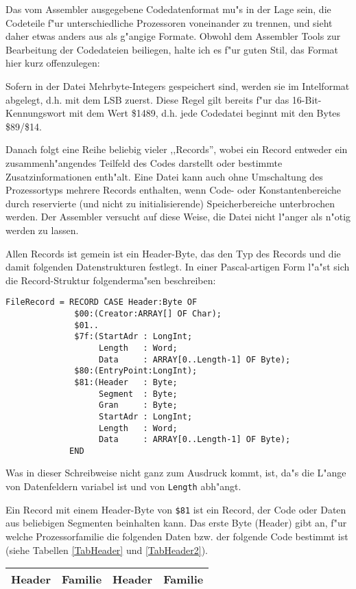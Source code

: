 \documentclass[12pt,a4paper,twoside]{report}
\begin{document}
Das vom Assembler ausgegebene Codedatenformat mu"s in der Lage sein,
die Codeteile f"ur unterschiedliche Prozessoren voneinander zu trennen,
und sieht daher etwas anders aus als g"angige Formate.  Obwohl dem
Assembler Tools zur Bearbeitung der Codedateien beiliegen, halte ich es
f"ur guten Stil, das Format hier kurz offenzulegen:
\par
Sofern in der Datei Mehrbyte-Integers gespeichert sind, werden sie
im Intelformat abgelegt, d.h. mit dem LSB zuerst.  Diese Regel gilt
bereits f"ur das 16-Bit-Kennungswort mit dem Wert \$1489, d.h. jede
Codedatei beginnt mit den Bytes \$89/\$14.
\par
Danach folgt eine Reihe beliebig vieler ,,Records'', wobei ein Record
entweder ein zusammenh"angendes Teilfeld des Codes darstellt oder bestimmte
Zusatzinformationen enth"alt.  Eine Datei
kann auch ohne Umschaltung des Prozessortyps mehrere Records enthalten,
wenn Code- oder Konstantenbereiche durch reservierte (und nicht zu
initialisierende) Speicherbereiche unterbrochen werden.  Der Assembler
versucht auf diese Weise, die Datei nicht l"anger als n"otig werden
zu lassen.
\par
Allen Records ist gemein ist ein Header-Byte, das den Typ des Records
und die damit folgenden Datenstrukturen festlegt.  In einer Pascal-artigen
Form l"a"st sich die Record-Struktur folgenderma"sen beschreiben:
\begin{verbatim}
FileRecord = RECORD CASE Header:Byte OF
              $00:(Creator:ARRAY[] OF Char);
              $01..
              $7f:(StartAdr : LongInt;
                   Length   : Word;
                   Data     : ARRAY[0..Length-1] OF Byte);
              $80:(EntryPoint:LongInt);
              $81:(Header   : Byte;
                   Segment  : Byte;
                   Gran     : Byte;
                   StartAdr : LongInt;
                   Length   : Word;
                   Data     : ARRAY[0..Length-1] OF Byte);
             END
\end{verbatim}
Was in dieser Schreibweise nicht ganz zum Ausdruck kommt, ist, da"s
die L"ange von Datenfeldern variabel ist und von {\tt Length} abh"angt.
\par
Ein Record mit einem Header-Byte von \verb!$81! ist ein Record, der Code
oder Daten aus beliebigen Segmenten beinhalten kann.  Das erste
Byte (Header) gibt an, f"ur welche Prozessorfamilie die folgenden
Daten bzw. der folgende  Code bestimmt ist (siehe Tabellen \ref{TabHeader}
und \ref{TabHeader2}).

\begin{table*}[htbp]
\begin{center}\begin{tabular}{|c|l||c|l|}
\hline
Header & Familie & Header & Familie \\
\hline
\hline

\end{tabular}\end{center}
\caption{Headerbytes f"ur die verschiedenen Prozessorfamilien\label{TabHeader}}
\end{table*}
\end{document}
